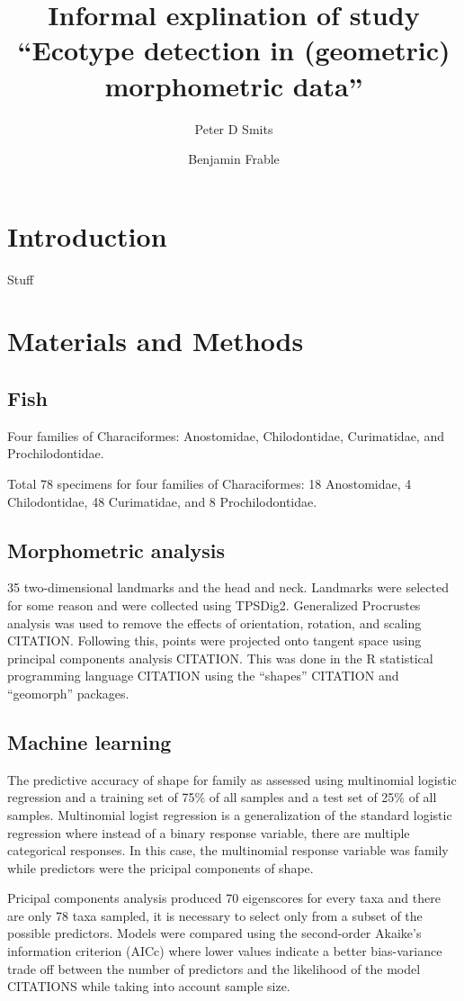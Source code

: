 \documentclass{article}\usepackage{graphicx, color}
\title{Informal explination of study ``Ecotype detection in (geometric) morphometric data''}
\author{Peter D Smits \and Benjamin Frable}
\begin{document}
\maketitle

\section{Introduction}
Stuff

\section{Materials and Methods}

\subsection{Fish}
Four families of Characiformes: Anostomidae, Chilodontidae, Curimatidae, and Prochilodontidae.

Total 78 specimens for four families of Characiformes: 18 Anostomidae, 4 Chilodontidae, 48 Curimatidae, and 8 Prochilodontidae.

\subsection{Morphometric analysis}
35 two-dimensional landmarks and the head and neck. Landmarks were selected for some reason and were collected using TPSDig2. Generalized Procrustes analysis was used to remove the effects of orientation, rotation, and scaling CITATION. Following this, points were projected onto tangent space using principal components analysis CITATION. This was done in the R statistical programming language CITATION using the ``shapes'' CITATION and ``geomorph'' packages.

\subsection{Machine learning}
The predictive accuracy of shape for family as assessed using multinomial logistic regression and a training set of 75\% of all samples and a test set of 25\% of all samples. Multinomial logist regression is a generalization of the standard logistic regression where instead of a binary response variable, there are multiple categorical responses. In this case, the multinomial response variable was family while predictors were the pricipal components of shape.

Pricipal components analysis produced 70 eigenscores for every taxa and there are only 78 taxa sampled, it is necessary to select only from a subset of the possible predictors. Models were compared using the second-order Akaike's information criterion (AICc) where lower values indicate a better bias-variance trade off between the number of predictors and the likelihood of the model CITATIONS while taking into account sample size. 
\end{document}
